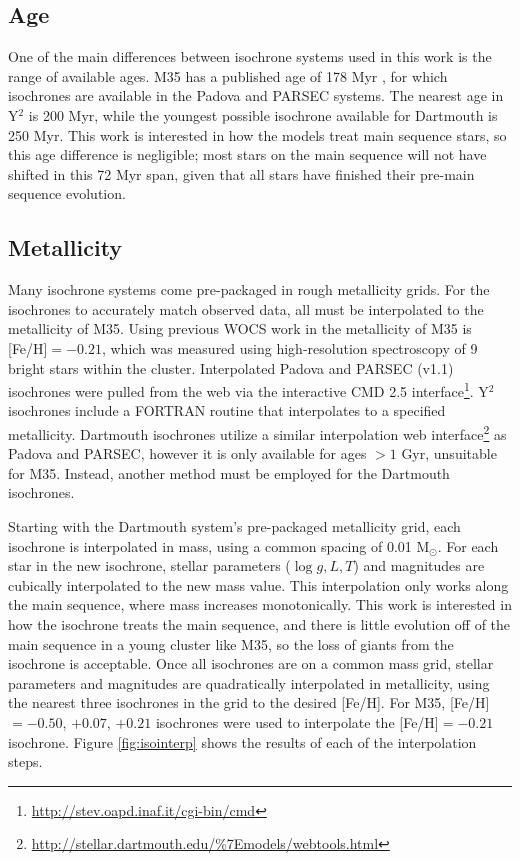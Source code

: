 \documentclass[iop]{emulateapj}
\begin{document}
\subsection{Age}
One of the main differences between isochrone systems used in this work is the range of available ages. M35 has a published age of 178 Myr \citep{2002AA...389..871D}, for which isochrones are available in the Padova and PARSEC systems. The nearest age in Y$^2$ is 200 Myr, while the youngest possible isochrone available for Dartmouth is 250 Myr. This work is interested in how the models treat main sequence stars, so this age difference is negligible; most stars on the main sequence will not have shifted in this 72 Myr span, given that all stars have finished their pre-main sequence evolution.

\subsection{Metallicity}
Many isochrone systems come pre-packaged in rough metallicity grids. For the isochrones to accurately match observed data, all must be interpolated to the metallicity of M35. Using previous WOCS work in \citet{2001ApJ...549..452B} the metallicity of M35 is [Fe/H]$=-0.21$, which was measured using high-resolution spectroscopy of 9 bright stars within the cluster. Interpolated Padova and PARSEC (v1.1) isochrones were pulled from the web via the interactive CMD 2.5 interface\footnote{\url{http://stev.oapd.inaf.it/cgi-bin/cmd}}. Y$^2$ isochrones include a FORTRAN routine that interpolates to a specified metallicity. Dartmouth isochrones utilize a similar interpolation web interface\footnote{\url{http://stellar.dartmouth.edu/\%7Emodels/webtools.html}} as Padova and PARSEC, however it is only available for ages $> 1$ Gyr, unsuitable for M35. Instead, another method must be employed for the Dartmouth isochrones.

Starting with the Dartmouth system's pre-packaged metallicity grid, each isochrone is interpolated in mass, using a common spacing of 0.01 M$_\odot$. For each star in the new isochrone, stellar parameters ($\log g,L,T$) and magnitudes are cubically interpolated to the new mass value. This interpolation only works along the main sequence, where mass increases monotonically. This work is interested in how the isochrone treats the main sequence, and there is little evolution off of the main sequence in a young cluster like M35, so the loss of giants from the isochrone is acceptable. Once all isochrones are on a common mass grid, stellar parameters and magnitudes are quadratically interpolated in metallicity, using the nearest three isochrones in the grid to the desired [Fe/H]. For M35, [Fe/H]$=-0.50$, $+0.07$, $+0.21$ isochrones were used to interpolate the [Fe/H]$=-0.21$ isochrone. Figure \ref{fig:isointerp} shows the results of each of the interpolation steps.
\end{document}
